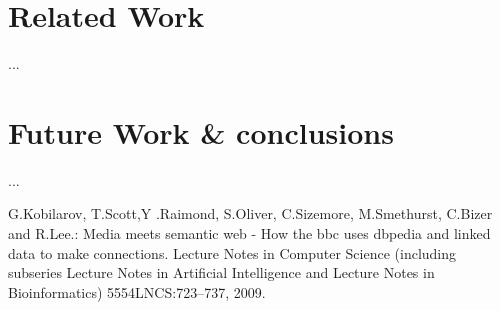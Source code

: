 \documentclass{llncs}
\begin{document}
\section{Related Work}
%
...
%
\section{Future Work \& conclusions}
%
...

%
%
%

%

%
%
\begin{thebibliography}{5}
%
G.Kobilarov, T.Scott,Y .Raimond, S.Oliver, C.Sizemore, M.Smethurst, C.Bizer and R.Lee.:
Media meets semantic web - How the bbc uses dbpedia and linked data to make connections.
Lecture Notes in Computer Science (including subseries Lecture Notes in Artiﬁcial Intelligence and Lecture Notes in Bioinformatics)
5554LNCS:723–737, 2009.

\end{thebibliography}
\end{document}

